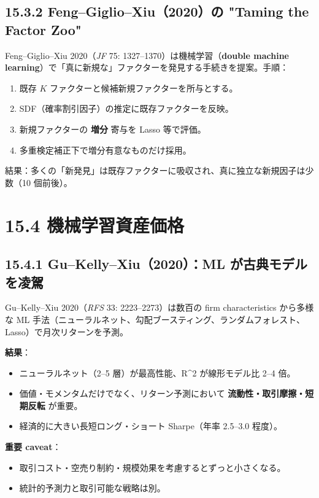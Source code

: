 \documentclass[11pt,a4paper]{report}
\begin{document}
\subsection{15.3.2 Feng–Giglio–Xiu（2020）の "Taming the Factor Zoo"}

Feng–Giglio–Xiu 2020（\emph{JF} 75: 1327–1370）は機械学習（\textbf{double machine learning}）で「真に新規な」ファクターを発見する手続きを提案。手順：

\begin{enumerate}
\item 既存 $K$ ファクターと候補新規ファクターを所与とする。
\item SDF（確率割引因子）の推定に既存ファクターを反映。
\item 新規ファクターの \textbf{増分} 寄与を Lasso 等で評価。
\item 多重検定補正下で増分有意なものだけ採用。
\end{enumerate}

結果：多くの「新発見」は既存ファクターに吸収され、真に独立な新規因子は少数（10 個前後）。

\section{15.4 機械学習資産価格}

\subsection{15.4.1 Gu–Kelly–Xiu（2020）：ML が古典モデルを凌駕}

Gu–Kelly–Xiu 2020（\emph{RFS} 33: 2223–2273）は数百の firm characteristics から多様な ML 手法（ニューラルネット、勾配ブースティング、ランダムフォレスト、Lasso）で月次リターンを予測。

\textbf{結果}：
\begin{itemize}
\item ニューラルネット（2–5 層）が最高性能、R\textasciicircum{}2 が線形モデル比 2–4 倍。
\item 価値・モメンタムだけでなく、リターン予測において \textbf{流動性・取引摩擦・短期反転} が重要。
\item 経済的に大きい長短ロング・ショート Sharpe（年率 2.5–3.0 程度）。
\end{itemize}

\textbf{重要 caveat}：
\begin{itemize}
\item 取引コスト・空売り制約・規模効果を考慮するとずっと小さくなる。
\item 統計的予測力と取引可能な戦略は別。
\end{itemize}
\end{document}
